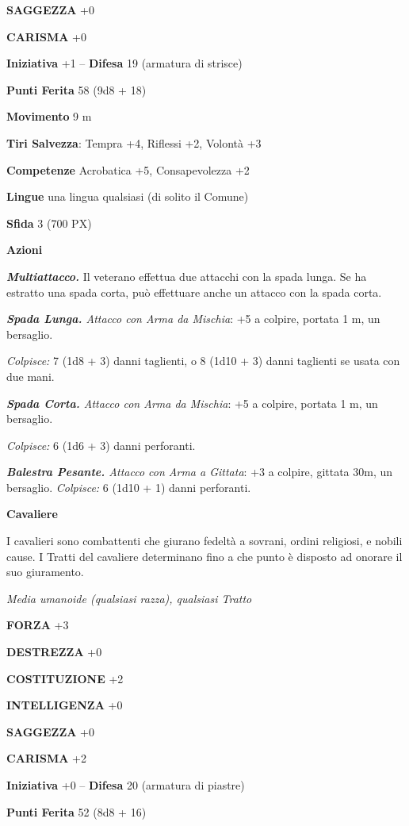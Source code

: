 \begin{multicols}{2}
\textbf{SAGGEZZA} +0

\textbf{CARISMA} +0

\textbf{Iniziativa} +1 -- \textbf{Difesa} 19 (armatura di strisce)

\textbf{Punti Ferita} 58 (9d8 + 18)

\textbf{Movimento} 9 m

\textbf{Tiri Salvezza}: Tempra +4, Riflessi +2, Volontà +3

\textbf{Competenze} Acrobatica +5, Consapevolezza +2

\textbf{Lingue} una lingua qualsiasi (di solito il Comune)

\textbf{Sfida} 3 (700 PX)

\textbf{Azioni}

\textit{\textbf{Multiattacco.}} Il veterano effettua due attacchi con la spada lunga. Se ha estratto una spada corta, può effettuare anche un attacco con la spada corta.

\textit{\textbf{Spada Lunga.} Attacco con Arma da Mischia}: +5 a colpire, portata 1 m, un bersaglio.

\textit{Colpisce:} 7 (1d8 + 3) danni taglienti, o 8 (1d10 + 3) danni taglienti se usata con due mani.

\textit{\textbf{Spada Corta.} Attacco con Arma da Mischia}: +5 a colpire, portata 1 m, un bersaglio.

\textit{Colpisce:} 6 (1d6 + 3) danni perforanti.

\textit{\textbf{Balestra Pesante.} Attacco con Arma a Gittata}: +3 a colpire, gittata 30m, un bersaglio. \textit{Colpisce:} 6 (1d10 + 1) danni perforanti.

\medskip\textbf{Cavaliere}

I cavalieri sono combattenti che giurano fedeltà a sovrani, ordini religiosi, e nobili cause. I Tratti del cavaliere determinano fino a che punto è disposto ad onorare il suo giuramento.

\textit{Media umanoide (qualsiasi razza), qualsiasi Tratto}

\textbf{FORZA} +3

\textbf{DESTREZZA} +0

\textbf{COSTITUZIONE} +2

\textbf{INTELLIGENZA} +0

\textbf{SAGGEZZA} +0

\textbf{CARISMA} +2

\textbf{Iniziativa} +0 -- \textbf{Difesa} 20 (armatura di piastre)

\textbf{Punti Ferita} 52 (8d8 + 16)


\end{multicols}
